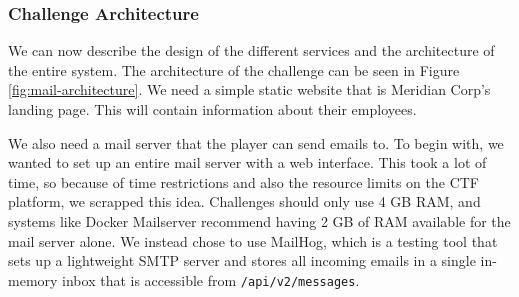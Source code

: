 \subsubsection{Challenge Architecture}

We can now describe the design of the different services and the architecture of the entire system. The architecture of the challenge can be seen in Figure \ref{fig:mail-architecture}. We need a simple static website that is Meridian Corp's landing page. This will contain information about their employees.

We also need a mail server that the player can send emails to. To begin with, we wanted to set up an entire mail server with a web interface. This took a lot of time, so because of time restrictions and also the resource limits on the CTF platform, we scrapped this idea. Challenges should only use 4 GB RAM, and systems like Docker Mailserver recommend having 2 GB of RAM available for the mail server alone\cite{dms_recommended}. We instead chose to use MailHog\cite{github__mailhog}, which is a testing tool that sets up a lightweight SMTP server and stores all incoming emails in a single in-memory inbox that is accessible from \texttt{/api/v2/messages}.

